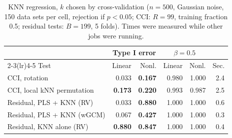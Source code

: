 \documentclass[10pt,leqno]{amsart}
\newcommand{\hi}[1]{\textbf{#1}}            %
\begin{document}
\begin{table}[H]
\caption{KNN regression, $k$ chosen by cross-validation ($n=500$, Gaussian noise, 150 data sets per cell, rejection if $p<0.05$; CCI: $R=99$, training fraction 0.5; residual tests: $B=199$, 5 folds). Times were measured while other jobs were running.}
\label{tab:knn}
\footnotesize
\setlength{\tabcolsep}{4pt}
\begin{tabular}{lrrrrr}
\toprule
 & \multicolumn{2}{c}{Type I error} & \multicolumn{2}{c}{$\beta=0.5$} & \\
\cmidrule(lr){2-3}\cmidrule(lr){4-5}
Test & Linear & Nonl. & Linear & Nonl. & Sec. \\
\midrule
CCI, rotation & 0.033 & \hi{0.167} & 0.980 & 1.000 & 2.4 \\
CCI, local kNN permutation & \hi{0.173} & \hi{0.220} & 0.993 & 0.987 & 2.5 \\
Residual, PLS + KNN (RV) & 0.033 & \hi{0.880} & 1.000 & 1.000 & 0.6 \\
Residual, PLS + KNN (wGCM) & 0.067 & \hi{0.427} & 1.000 & 1.000 & 0.3 \\
Residual, KNN alone (RV) & \hi{0.880} & \hi{0.847} & 1.000 & 1.000 & 0.4 \\
\bottomrule
\end{tabular}
\end{table}
\end{document}
